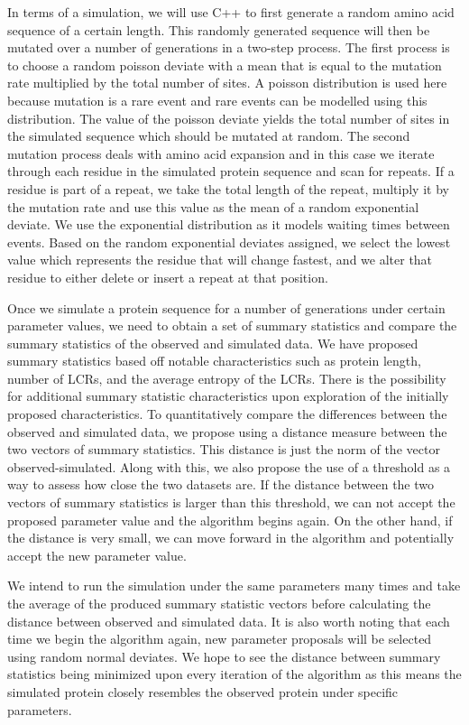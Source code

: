 \documentclass{article}
\begin{document}
In terms of a simulation, we will use C++ to first generate a random amino acid sequence of a certain length. This
randomly generated sequence will then be mutated over a number of generations in a two-step process. The first process is
to choose a random poisson deviate with a mean that is equal to the mutation rate multiplied by the total number of sites. A
poisson distribution is used here because mutation is a rare event and rare events can be modelled using this distribution. The
value of the poisson deviate yields the total number of sites in the simulated sequence which should be mutated at random.
The second mutation process deals with amino acid expansion and in this case we iterate through each residue in the simulated
protein sequence and scan for repeats. If a residue is part of a repeat, we take the total length of the repeat, multiply it by the
mutation rate and use this value as the mean of a random exponential deviate. We use the exponential distribution as it models
waiting times between events. Based on the random exponential deviates assigned, we select the lowest value which represents
the residue that will change fastest, and we alter that residue to either delete or insert a repeat at that position.

Once we simulate a protein sequence for a number of generations under certain parameter values, we need to obtain a
set of summary statistics and compare the summary statistics of the observed and simulated data. We have proposed summary
statistics based off notable characteristics such as protein length, number of LCRs, and the average entropy of the LCRs. There
is the possibility for additional summary statistic characteristics upon exploration of the initially proposed characteristics. To
quantitatively compare the differences between the observed and simulated data, we propose using a distance measure between
the two vectors of summary statistics. This distance is just the norm of the vector observed-simulated. Along with this, we also
propose the use of a threshold as a way to assess how close the two datasets are. If the distance between the two vectors of
summary statistics is larger than this threshold, we can not accept the proposed parameter value and the algorithm begins again.
On the other hand, if the distance is very small, we can move forward in the algorithm and potentially accept the new parameter
value.

We intend to run the simulation under the same parameters many times and take the average of the produced summary
statistic vectors before calculating the distance between observed and simulated data. It is also worth noting that each time we
begin the algorithm again, new parameter proposals will be selected using random normal deviates. We hope to see the distance
between summary statistics being minimized upon every iteration of the algorithm as this means the simulated protein closely
resembles the observed protein under specific parameters.
\end{document}
